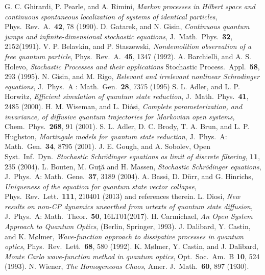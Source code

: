 \begin{thebibliography}{99}
	 G. C. Ghirardi, P. Pearle, and  A. Rimini, {\em Markov processes in Hilbert space and continuous spontaneous localization of systems of identical particles}, Phys.\ Rev.\ A.\ {\bf 42}, 78 (1990). 
	 D. Gatarek, and N. Gisin, {\em Continuous quantum jumps and infinite-dimensional stochastic equations}, J.\ Math.\ Phys.\ {\bf 32}, 2152(1991). 
	 V. P. Belavkin, and P. Staszewski, {\em Nondemolition observation of a free quantum particle}, Phys.\ Rev.\ A.\ {\bf 45}, 1347  (1992). 
	 A. Barchielli, and A. S. Holevo, {\em Stochastic Processes and their applications} Stochastic Process.\ Appl.\ {\bf 58}, 293 (1995).
	 N. Gisin, and M. Rigo, {\em Relevant and irrelevant nonlinear Schrodinger equations}, J.\ Phys.\ A : Math.\ Gen.\ {\bf 28}, 7375 (1995)
	 S. L. Adler, and L. P. Horwitz, {\em Efficient simulation of quantum state reduction}, J.\ Math.\ Phys.\ {\bf 41}, 2485 (2000).   
	 H. M. Wiseman, and  L. Di{\'o}si, {\em Complete parameterization, and invariance, of diffusive quantum trajectories for Markovian open systems}, Chem.\ Phys.\ {\bf 268}, 91 (2001). 
	 S. L. Adler, D. C. Brody, T. A. Brun, and L. P. Hughston, {\em Martingale models for quantum state reduction},  J.\ Phys.\ A: Math.\ Gen.\ {\bf 34}, 8795 (2001). 
	 J. E. Gough, and A. Sobolev, Open Syst.\ Inf.\ Dyn.\ {\em Stochastic Schrödinger equations as limit of discrete filtering}, {\bf 11}, 235 (2004).
	 L. Bouten, M. Gu{\c t}{\u a} and  H. Massen, {\em Stochastic Schrödinger equations}, J.\ Phys.\ A: Math.\ Gene.\ {\bf 37}, 3189 (2004). 
	 A. Bassi, D. D{\"u}rr, and  G. Hinrichs, {\em Uniqueness of the equation for quantum state vector collapse}, Phys.\ Rev.\ Lett.\ {\bf 111}, 210401 (2013) and references therein.  
	 L. Diosi, {\em New results on non-CP dynamics unearthed from urtexts of quantum state diffusion}, J.\ Phys.\ A: Math.\ Theor.\ {\bf 50}, 16LT01(2017). 
	 H. Carmichael, {\it An Open System Approach to Quantum Optics}, (Berlin, Springer, 1993). 
	 J. Dalibard, Y. Castin, and K. M{\o}lmer,  {\em Wave-function approach to dissipative processes in quantum optics}, Phys.\ Rev.\ Lett.\ {\bf 68}, 580 (1992). 
	 K. M{\o}lmer, Y. Castin, and J. Dalibard, {\em Monte Carlo wave-function method in quantum optics}, Opt.\ Soc.\ Am.\ B {\bf 10}, 524 (1993).   
	 N. Wiener, {\em The Homogeneous Chaos}, Amer. J.\ Math.\ {\bf 60}, 897 (1930).   

\end{thebibliography}

